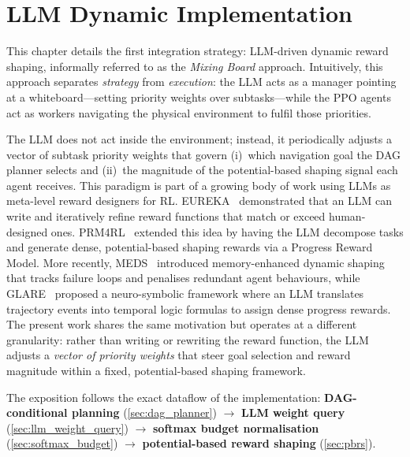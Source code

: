 \section{LLM Dynamic Implementation}
\label{ch:dynamic_implementation}

This chapter details the first integration strategy: LLM-driven dynamic reward shaping,
informally referred to as the \emph{Mixing Board} approach.
Intuitively, this approach separates \emph{strategy} from \emph{execution}:
the LLM acts as a manager pointing at a whiteboard---setting priority
weights over subtasks---while the PPO agents~\parencite{Yu_Velu_Vinitsky_Gao_Wang_Bayen_Wu_2022} act as workers navigating
the physical environment to fulfil those priorities.

The LLM does not act inside the environment; instead, it periodically
adjusts a vector of subtask priority weights that govern
(i)~which navigation goal the DAG planner selects and
(ii)~the magnitude of the potential-based shaping signal each agent receives.
This paradigm is part of a growing body of work using LLMs as
meta-level reward designers for RL.
EUREKA~\parencite{ma2024eurekahumanlevelrewarddesign} demonstrated that an
LLM can write and iteratively refine reward functions that match or
exceed human-designed ones.
PRM4RL~\parencite{Zhang_Gao_Jiang_Chen_Pan_Zhang_Deng_2025} extended this
idea by having the LLM decompose tasks and generate dense,
potential-based shaping rewards via a Progress Reward Model.
More recently, MEDS~\parencite{liu2026memoryenhanceddynamic}
introduced memory-enhanced dynamic shaping that tracks failure loops
and penalises redundant agent behaviours, while
GLARE~\parencite{yan2026glare} proposed a neuro-symbolic framework where
an LLM translates trajectory events into temporal logic formulas to
assign dense progress rewards.
The present work shares the same motivation but operates at a different
granularity: rather than writing or rewriting the reward function, the
LLM adjusts a \emph{vector of priority weights} that steer goal
selection and reward magnitude within a fixed, potential-based shaping
framework.

The exposition follows the exact dataflow of the implementation:
\textbf{DAG-conditional planning} (\cref{sec:dag_planner}) $\rightarrow$
\textbf{LLM weight query} (\cref{sec:llm_weight_query}) $\rightarrow$
\textbf{softmax budget normalisation} (\cref{sec:softmax_budget}) $\rightarrow$
\textbf{potential-based reward shaping} (\cref{sec:pbrs}).

